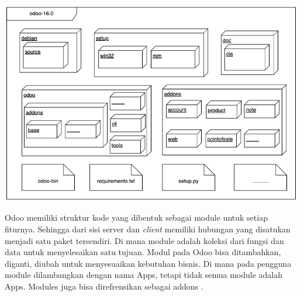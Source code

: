 \begin{center}
	\includegraphics[width=14cm]{img/bab_2/folder_odoo.png}
	\label{fig:folderOdoo}
\end{center}

Odoo memiliki struktur kode yang dibentuk sebagai module untuk setiap fiturnya. Sehingga dari sisi server dan \textit{client} memiliki hubungan yang disatukan menjadi satu paket tersendiri. Di mana module adalah koleksi dari fungsi dan data untuk menyelesaikan satu tujuan. Modul pada Odoo bisa ditambahkan, diganti, diubah untuk menyesuaikan kebutuhan bisnis. Di mana pada pengguna module dilambangkan dengan nama Apps, tetapi tidak semua module adalah Apps. Modules juga bisa direfrensikan sebagai addons \cite{odoo}. 

